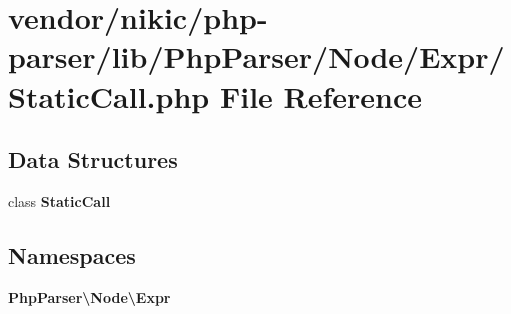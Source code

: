 \section{vendor/nikic/php-\/parser/lib/\+Php\+Parser/\+Node/\+Expr/\+Static\+Call.php File Reference}
\label{_static_call_8php}
\subsection*{Data Structures}
\begin{DoxyCompactItemize}
\item 
class {\bf Static\+Call}
\end{DoxyCompactItemize}
\subsection*{Namespaces}
\begin{DoxyCompactItemize}
\item 
 {\bf Php\+Parser\textbackslash{}\+Node\textbackslash{}\+Expr}
\end{DoxyCompactItemize}
